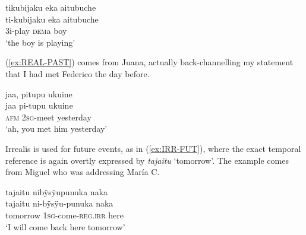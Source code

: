 \ea\label{ex:REAL-PRES-2}
\begingl 
\glpreamble tikubijaku eka aitubuche\\
\gla ti-kubijaku eka aitubuche\\ 
\glb 3i-play \textsc{dem}a boy\\ 
\glft ‘the boy is playing’
 \trailingcitation{[mdx-c120416ls.183]}
\xe

(\ref{ex:REAL-PAST}) comes from Juana, actually back-channelling my statement that I had met Fe\-de\-ri\-co the day before.

\ea\label{ex:REAL-PAST}
\begingl 
\glpreamble jaa, pitupu ukuine\\
\gla jaa pi-tupu ukuine\\ 
\glb \textsc{afm} 2\textsc{sg}-meet yesterday\\ 
\glft ‘ah, you met him yesterday’
 \trailingcitation{[jxx-e120516l-1.058]}
\xe
{}


Irrealis is used for future events, as in (\ref{ex:IRR-FUT}), where the exact temporal reference is again overtly expressed by \textit{tajaitu} ‘tomorrow’. The example comes from Miguel who was addressing María C.


\ea\label{ex:IRR-FUT}
\begingl
\glpreamble tajaitu nibÿsÿupunuka naka\\
\gla tajaitu ni-bÿsÿu-punuka naka\\
\glb tomorrow 1\textsc{sg}-come-\textsc{reg.irr} here\\
\glft ‘I will come back here tomorrow’
\endgl
 \trailingcitation{[mux-c110810l.140]}
\xe
{}



